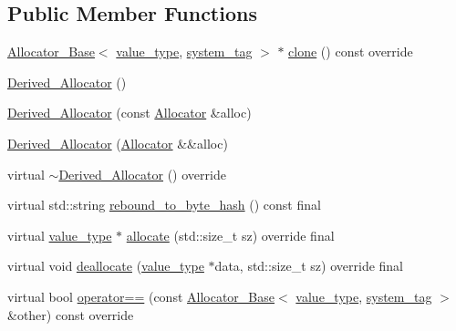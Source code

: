 \subsection*{Public Member Functions}
\begin{DoxyCompactItemize}
\item 
\hyperlink{structbc_1_1allocators_1_1pa__detail_1_1Allocator__Base}{Allocator\+\_\+\+Base}$<$ \hyperlink{structbc_1_1allocators_1_1pa__detail_1_1Derived__Allocator_a997c60e64ca7028da4c9eb15b5bf553d}{value\+\_\+type}, \hyperlink{structbc_1_1allocators_1_1pa__detail_1_1Derived__Allocator_a42f99505929fa39c067d186f5f623045}{system\+\_\+tag} $>$ $\ast$ \hyperlink{structbc_1_1allocators_1_1pa__detail_1_1Derived__Allocator_af11b1d876a4b0f7c7eb54231730eb3a8}{clone} () const override
\item 
\hyperlink{structbc_1_1allocators_1_1pa__detail_1_1Derived__Allocator_ae9f01e2b16db4fc2fec9e69947659bb9}{Derived\+\_\+\+Allocator} ()
\item 
\hyperlink{structbc_1_1allocators_1_1pa__detail_1_1Derived__Allocator_a72853b8b5e37a81c2f766d8dab779153}{Derived\+\_\+\+Allocator} (const \hyperlink{classbc_1_1allocators_1_1Allocator}{Allocator} \&alloc)
\item 
\hyperlink{structbc_1_1allocators_1_1pa__detail_1_1Derived__Allocator_a3b6c03c5af767dd9912c12b7ec8ae18e}{Derived\+\_\+\+Allocator} (\hyperlink{classbc_1_1allocators_1_1Allocator}{Allocator} \&\&alloc)
\item 
virtual \hyperlink{structbc_1_1allocators_1_1pa__detail_1_1Derived__Allocator_a4640d317cab7d3bcd42fe5b975551dc1}{$\sim$\+Derived\+\_\+\+Allocator} () override
\item 
virtual std\+::string \hyperlink{structbc_1_1allocators_1_1pa__detail_1_1Derived__Allocator_a167659ce0c822b659fbd6ff3ced83876}{rebound\+\_\+to\+\_\+byte\+\_\+hash} () const final
\item 
virtual \hyperlink{structbc_1_1allocators_1_1pa__detail_1_1Derived__Allocator_a997c60e64ca7028da4c9eb15b5bf553d}{value\+\_\+type} $\ast$ \hyperlink{structbc_1_1allocators_1_1pa__detail_1_1Derived__Allocator_acbfe2862777bf8810e925d78c9511a66}{allocate} (std\+::size\+\_\+t sz) override final
\item 
virtual void \hyperlink{structbc_1_1allocators_1_1pa__detail_1_1Derived__Allocator_a14b837c6cc64fe049f9c18d219e13cf5}{deallocate} (\hyperlink{structbc_1_1allocators_1_1pa__detail_1_1Derived__Allocator_a997c60e64ca7028da4c9eb15b5bf553d}{value\+\_\+type} $\ast$data, std\+::size\+\_\+t sz) override final
\item 
virtual bool \hyperlink{structbc_1_1allocators_1_1pa__detail_1_1Derived__Allocator_ad4aa49cda67ab382b2e91225dc3d8b36}{operator==} (const \hyperlink{structbc_1_1allocators_1_1pa__detail_1_1Allocator__Base}{Allocator\+\_\+\+Base}$<$ \hyperlink{structbc_1_1allocators_1_1pa__detail_1_1Derived__Allocator_a997c60e64ca7028da4c9eb15b5bf553d}{value\+\_\+type}, \hyperlink{structbc_1_1allocators_1_1pa__detail_1_1Derived__Allocator_a42f99505929fa39c067d186f5f623045}{system\+\_\+tag} $>$ \&other) const override
\end{DoxyCompactItemize}
